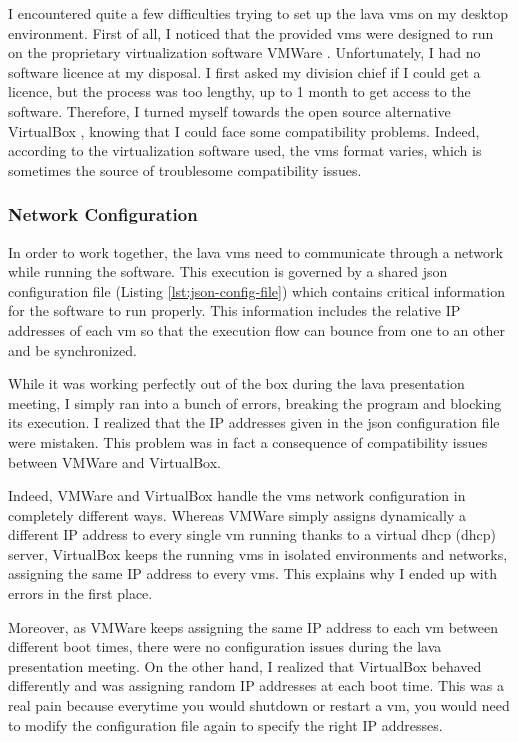 I encountered quite a few difficulties trying to set up the \gls{lava} \glspl{vm} on my desktop environment. First of all, I noticed that the provided \glspl{vm} were designed to run on the proprietary virtualization software VMWare \cite{vmware2016official}. Unfortunately, I had no software licence at my disposal. I first asked my division chief if I could get a licence, but the process was too lengthy, up to 1 month to get access to the software. Therefore, I turned myself towards the open source alternative VirtualBox \cite{virtualbox2016official}, knowing that I could face some compatibility problems. Indeed, according to the virtualization software used, the \glspl{vm} format varies, which is sometimes the source of troublesome compatibility issues.

\subsubsection{Network Configuration}

In order to work together, the \gls{lava} \glspl{vm} need to communicate through a network while running the software. This execution is governed by a shared \gls{json} configuration file (Listing \ref{lst:json-config-file}) which contains critical information for the software to run properly. This information includes the relative IP addresses of each \gls{vm} so that the execution flow can bounce from one to an other and be synchronized.

While it was working perfectly out of the box during the \gls{lava} presentation meeting, I simply ran into a bunch of errors, breaking the program and blocking its execution. I realized that the IP addresses given in the \gls{json} configuration file were mistaken. This problem was in fact a consequence of compatibility issues between VMWare and VirtualBox.

Indeed, VMWare and VirtualBox handle the \glspl{vm} network configuration in completely different ways. Whereas VMWare simply assigns dynamically a different IP address to every single \gls{vm} running thanks to a virtual \acrshort{dhcp} (\acrlong{dhcp}) server, VirtualBox keeps the running \glspl{vm} in isolated environments and networks, assigning the same IP address to every \glspl{vm}. This explains why I ended up with errors in the first place.

Moreover, as VMWare keeps assigning the same IP address to each \gls{vm} between different boot times, there were no configuration issues during the \gls{lava} presentation meeting. On the other hand, I realized that VirtualBox behaved differently and was assigning random IP addresses at each boot time. This was a real pain because everytime you would shutdown or restart a \gls{vm}, you would need to modify the configuration file again to specify the right IP addresses.

